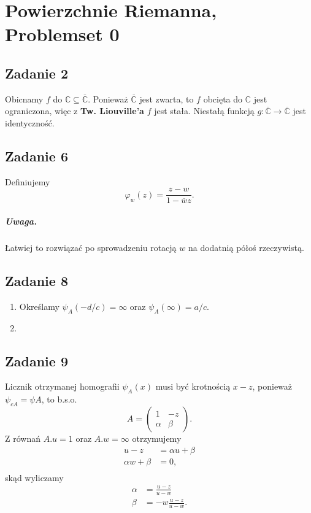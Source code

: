 \chapter{Powierzchnie Riemanna, Problemset 0}


\section*{Zadanie 2}

Obicnamy \( f \) do \( \mathbb{C} \subseteq \overline{ \mathbb{C} } \). Ponieważ \( \overline{ \mathbb{C} } \) jest zwarta, to \( f \) obcięta do \( \mathbb{C} \) jest ograniczona, więc z \textbf{Tw. Liouville'a} \( f \) jest stała. Niestałą funkcją \( g: \overline{ \mathbb{C} } \to \overline{ \mathbb{C} } \) jest identyczność.

\section*{Zadanie 6}

Definiujemy
\[ 
    \varphi_w(z) = \frac{z - w}{1 - \overline{w}z}.
\]


\paragraph{Uwaga.} Łatwiej to rozwiązać po sprowadzeniu rotacją \( w \) na dodatnią półoś rzeczywistą.

\section*{Zadanie 8}

\begin{enumerate}
    \item
    Określamy \( \psi_A(-d/c) = \infty \) oraz \( \psi_A(\infty) = a/c \). 

    \item
\end{enumerate}

\section*{Zadanie 9}

Licznik otrzymanej homografii \( \psi_A(x) \) musi być krotnością \( x - z \), ponieważ \( \psi_{cA} = \psi{A} \), to b.s.o.
\[ 
    A =  
    \begin{pmatrix}
        1 & -z \\
        \alpha & \beta
    \end{pmatrix}.
\]
Z równań \( A.u = 1 \) oraz \( A.w = \infty \) otrzymujemy
\begin{align}
    u - z &= \alpha u + \beta \\
    \alpha w + \beta &= 0, \\
\end{align}
skąd wyliczamy
\begin{align}
    \alpha &= \frac{u-z}{u - w} \\ 
    \beta &= -w\frac{u-z}{u-w}.
\end{align}

